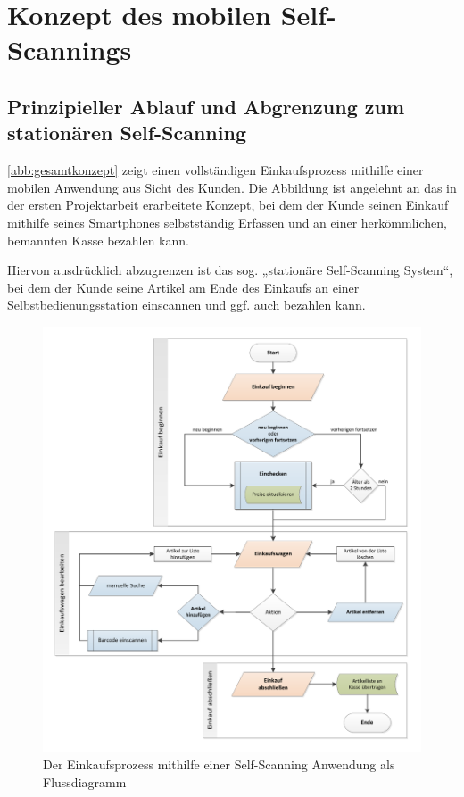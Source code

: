 \section{Konzept des mobilen Self-Scannings}
\subsection{Prinzipieller Ablauf und Abgrenzung zum stationären Self-Scanning}\label{prinzipieller-ablauf}
\vref*{abb:gesamtkonzept} zeigt einen vollständigen Einkaufsprozess mithilfe einer mobilen Anwendung aus Sicht des Kunden. Die Abbildung ist angelehnt an das in der ersten Projektarbeit erarbeitete Konzept, bei dem der Kunde seinen Einkauf mithilfe seines Smartphones selbstständig Erfassen und an einer herkömmlichen, bemannten Kasse bezahlen kann.

Hiervon ausdrücklich abzugrenzen ist das sog. „stationäre Self-Scanning System“, bei dem der Kunde seine Artikel am Ende des Einkaufs an einer Selbstbedienungsstation einscannen und ggf. auch bezahlen kann.

\begin{figure}[H]
\includegraphics[width=\linewidth]{res/ablaufdiagramm_v2.pdf}
\caption{Der Einkaufsprozess mithilfe einer Self-Scanning Anwendung als Flussdiagramm}\label{abb:gesamtkonzept}
\end{figure}

